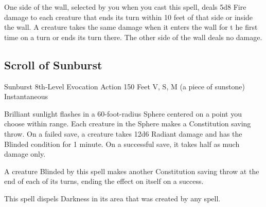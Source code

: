 \documentclass[letterpaper,openany,oneside,twocolumn]{book}
\begin{document}
One side of the wall, selected by you when you cast this spell, deals 5d8 Fire damage to each creature that ends its turn within 10 feet of that side or inside the wall. A creature takes the same damage when it enters the wall for t he first time on a turn or ends its turn there. The other side of the wall deals no damage.
\vfill\eject
\subsection*{Scroll of Sunburst}
\DndSpellHeader
  {Sunburst}
  {8th-Level Evocation}
  {Action}
  {150 Feet}
  {V, S, M (a piece of sunstone)}
  {Instantaneous}

Brilliant sunlight flashes in a 60-foot-radius Sphere centered on a point you choose within range. Each
creature in the Sphere makes a Constitution saving throw. On a failed save, a creature takes 12d6 Radiant damage and has the Blinded condition for 1 minute. On a successful save, it takes half as much damage only.

A creature Blinded by this spell makes another Constitution saving throw at the end of each of its turns, ending the effect on itself on a success.

This spell dispels Darkness in its area that was created by any spell.
\end{document}
